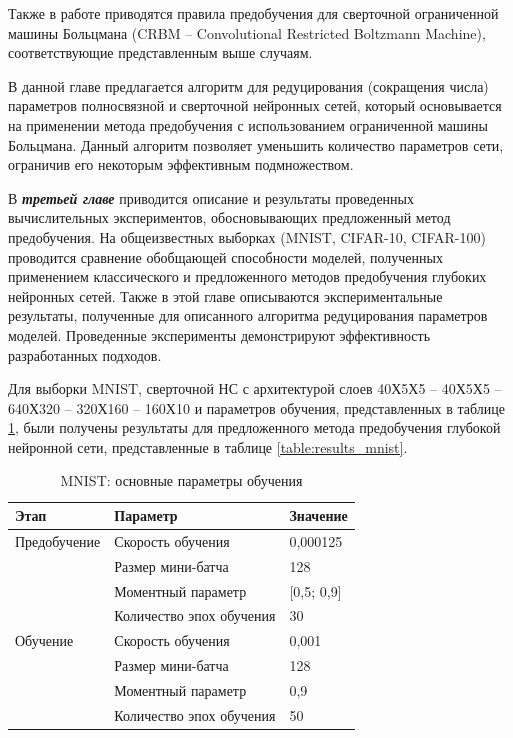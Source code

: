 \documentclass{thesisby}
\begin{document}
Также в работе приводятся правила предобучения для сверточной ограниченной машины Больцмана (CRBM -- Convolutional Restricted Boltzmann Machine), соответствующие представленным выше случаям.

В данной главе предлагается алгоритм для редуцирования (сокращения числа) параметров полносвязной и сверточной нейронных сетей, который основывается на применении метода предобучения с использованием ограниченной машины Больцмана. Данный алгоритм позволяет уменьшить количество параметров сети, ограничив его некоторым эффективным подмножеством. %
	
В \textbf{\textit{третьей главе}} приводится описание и результаты проведенных вычислительных экспериментов, обосновывающих предложенный метод предобучения. На общеизвестных выборках (MNIST, CIFAR-10, CIFAR-100) проводится сравнение обобщающей способности моделей, полученных применением классического и предложенного методов предобучения глубоких нейронных сетей. Также в этой главе описываются экспериментальные результаты, полученные для описанного алгоритма редуцирования параметров моделей. Проведенные эксперименты демонстрируют эффективность разработанных подходов.
	
Для выборки MNIST, сверточной НС с архитектурой слоев 40Х5Х5 -- 40Х5Х5 -- 640Х320 -- 320Х160 -- 160Х10 и параметров обучения, представленных в таблице \ref{table:params_mnist}, были получены результаты для предложенного метода предобучения глубокой нейронной сети, представленные в таблице \ref{table:results_mnist}.
	
\begin{table} [!h]
  \small
  \caption{MNIST: основные параметры обучения}\label{table:params_mnist}
\centering
\begin{tabular}{| p{3cm} | p{6cm} | p{2cm} |}
  \hline
    \textbf{Этап} & \textbf{Параметр} & \textbf{Значение}\\
    \hline
    Предобучение & Скорость обучения & 0,000125\\
    \cline{2-3}
    & Размер мини-батча & 128 \\
    \cline{2-3}
    & Моментный параметр & [0,5; 0,9] \\
    \cline{2-3}
    & Количество эпох обучения & 30\\
    \hline
    Обучение & Скорость обучения & 0,001\\
    \cline{2-3}
    & Размер мини-батча & 128 \\
    \cline{2-3}
    & Моментный параметр & 0,9 \\
    \cline{2-3}
    & Количество эпох обучения & 50\\
    \hline
\end{tabular}
\end{table}
\end{document}
